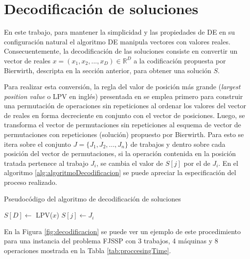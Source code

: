 \section{Decodificación de soluciones}
En este trabajo, para mantener la simplicidad y las propiedades de DE en su configuración natural el algoritmo DE manipula vectores con valores reales. Consecuentemente, la decodificación de las soluciones consiste en convertir un vector de reales $x = (x_{1}, x_{2}, . . . , x_{D}) \in \mathbb{R}^{D}$ a la codificación propuesta por Bierwirth, descripta en la sección anterior, para obtener una solución $S$.


Para realizar esta conversión, la regla del valor de posición más grande (\textit{largest position value} o LPV en inglés) presentada en \cite{YuanYuan} se emplea primero para construir una permutación de operaciones sin repeticiones al ordenar los valores del vector de reales en forma decreciente en conjunto con el vector de posiciones. Luego, se transforma el vector de permutaciones sin repeticiones al esquema de vector de permutaciones con repeticiones (solución) propuesto por Bierwirth. Para esto se itera sobre el conjunto $J = \{J_1, J_2, . . . , J_n\}$ de trabajos y dentro sobre cada posición del vector de permutaciones, si la operación contenida en la posición tratada pertenece al trabajo $J_i$, se cambia el valor de $S[j]$ por el de $J_i$. En el algoritmo \ref{alg:algoritmoDecodificacion} se puede apreciar la especificación del proceso realizado.

\begin{algorithm}[!tb]
    \caption{Pseudocódigo del algoritmo de decodificación de soluciones} \label{alg:algoritmoDecodificacion}
    \begin{algorithmic} [1]
        \State $S[D] \leftarrow $ LPV($x$)
                    \State $S[j] \leftarrow  J_i$
                \EndIf
            \EndFor
        \EndFor
    \end{algorithmic}
\end{algorithm}

En la Figura \ref{fig:decodificacion} se puede ver un ejemplo de este procedimiento para una instancia del problema FJSSP con 3 trabajos, 4 máquinas y 8 operaciones mostrada en la Tabla \ref{tab:proccesingTime}.

